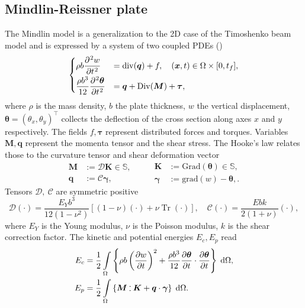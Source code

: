 \documentclass{ifacconf}
\DeclareMathOperator{\Tr}{Tr}
\def\onedot{$\mathsurround0pt\ldotp$}
\def\cddot{%
	\mathbin{\vcenter{\baselineskip.67ex
			\hbox{\onedot}\hbox{\onedot}}%
}}
\begin{document}
\subsection{Mindlin-Reissner plate}
The Mindlin model is a generalization to the 2D case of the Timoshenko beam model and is expressed by a system of two coupled PDEs (\cite{timoshenko1959theory}) 
\begin{equation}
\label{eq:clMin}
\begin{cases}
\displaystyle \rho b \diffp[2]{w}{t} &= \mathrm{div}(\bm{q}) + f, \quad (\bm{x}, t) \in \Omega \times [0, t_f],  \vspace{1mm}\\
\displaystyle \frac{\rho b^3}{12} \diffp[2]{\bm \theta}{t} &= \bm{q} + \mathrm{Div}(\bm M) + \bm{\tau}, \\
\end{cases}
\end{equation}
where $\rho$ is the mass density, $b$ the plate thickness, $w$ the vertical displacement, $\bm \theta = (\theta_x, \theta_y)^\top$ collects the deflection of the cross section along axes $x$ and $y$ respectively. The fields $f, \bm{\tau}$ represent distributed forces and torques. Variables $\bm{M}, \bm{q}$ represent the momenta tensor and the shear stress. The Hooke's law relates those to the curvature tensor and shear deformation vector
\begin{equation*}
\begin{aligned}
\bm{M} &:= \mathcal{D} \bm{K} \in \mathbb{S}, \\ \bm{q} &:= \mathcal{C} \bm{\gamma},
\end{aligned} \qquad
\begin{aligned}
\bm{K} &:= \mathrm{Grad}(\bm{\theta}) \in \mathbb{S}, \\ \bm{\gamma} &:= \mathrm{grad}(w) - \bm{\theta},.
\end{aligned}
\end{equation*}
Tensors $\mathcal{D}, \ \mathcal{C}$ are symmetric positive 
\begin{equation}
\label{eq:bend_rig_tensor}
	\mathcal{D} (\cdot) = \frac{E_Y b^3}{12 (1 - \nu^2)}[(1-\nu)(\cdot) + \nu \Tr(\cdot)], \quad \mathcal{C} (\cdot) = \frac{E b k }{2(1+\nu)}(\cdot),
\end{equation}
where $E_Y$ is the Young modulus, $\nu$ is the Poisson modulus, $k$ is the shear correction factor.
 The kinetic and potential energies  $E_c, E_p$ read
\begin{equation}
\begin{aligned}
E_c &=  \frac{1}{2} \int_{\Omega} \left\{ \rho b \left(\diffp{w}{t} \right)^2 +  \frac{\rho b^3}{12} \diffp{\bm{\theta}}{t} \cdot \diffp{\bm{\theta}}{t}  \right\} \d\Omega, \\
E_p &= \frac{1}{2} \int_{\Omega} \left\{ \bm{M} \cddot \bm{K} + \bm{q} \cdot \bm{\gamma}  \right\}\d\Omega.
\end{aligned}
\end{equation} 
\end{document}
